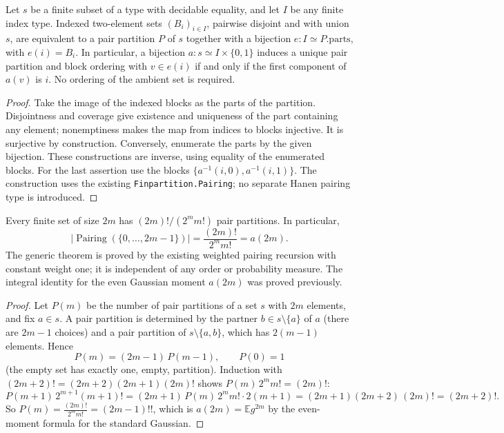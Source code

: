 \begin{lemma}\label{lem:sg-tal:hanen-pairing-bridge}
\leanok
{}
Let $s$ be a finite subset of a type with decidable equality, and let $I$ be any
finite index type. Indexed two-element sets $(B_i)_{i\in I}$, pairwise disjoint
and with union $s$, are equivalent to a pair partition $P$ of $s$ together with
a bijection $e:I\simeq P.\mathrm{parts}$, with $e(i)=B_i$.
In particular, a bijection $a:s\simeq I\times\{0,1\}$ induces a unique pair
partition and block ordering with $v\in e(i)$ if and only if the first component
of $a(v)$ is $i$. No ordering of the ambient set is required.
\end{lemma}
\begin{proof}
\leanok
Take the image of the indexed blocks as the parts of the partition. Disjointness
and coverage give existence and uniqueness of the part containing any element;
nonemptiness makes the map from indices to blocks injective. It is surjective
by construction. Conversely, enumerate the parts by the given bijection.
These constructions are inverse, using equality of the enumerated blocks.
For the last assertion use the blocks
$\{a^{-1}(i,0),a^{-1}(i,1)\}$. The construction uses the existing
\texttt{Finpartition.Pairing}; no separate Hanen pairing type is introduced.
\end{proof}

\begin{lemma}\label{lem:sg-tal:hanen-pairing-count}
\leanok
{}
Every finite set of size $2m$ has $(2m)!/(2^m m!)$ pair partitions. In particular,
\[
 |\operatorname{Pairing}(\{0,\ldots,2m-1\})|=\frac{(2m)!}{2^m m!}=a(2m).
\]
The generic theorem is proved by the existing weighted pairing recursion with
constant weight one; it is independent of any order or probability measure.
The integral identity for the even Gaussian moment $a(2m)$ was proved previously.
\end{lemma}
\begin{proof}
\leanok
Let $P(m)$ be the number of pair partitions of a set $s$ with $2m$ elements, and fix $a\in s$. A pair partition is determined by the partner $b\in s\setminus\{a\}$ of $a$ (there are $2m-1$ choices) and a pair partition of $s\setminus\{a,b\}$, which has $2(m-1)$ elements. Hence
\[
P(m)=(2m-1)\,P(m-1),\qquad P(0)=1
\]
(the empty set has exactly one, empty, partition). Induction with $(2m+2)!=(2m+2)(2m+1)(2m)!$ shows $P(m)\,2^mm!=(2m)!$:
\[
P(m+1)\,2^{m+1}(m+1)!=(2m+1)\,P(m)\,2^m m!\cdot2(m+1)=(2m+1)(2m+2)\,(2m)!=(2m+2)! .
\]
So $P(m)=\frac{(2m)!}{2^mm!}=(2m-1)!!$, which is $a(2m)=\mathbb Eg^{2m}$ by the even-moment formula for the standard Gaussian.
\end{proof}


